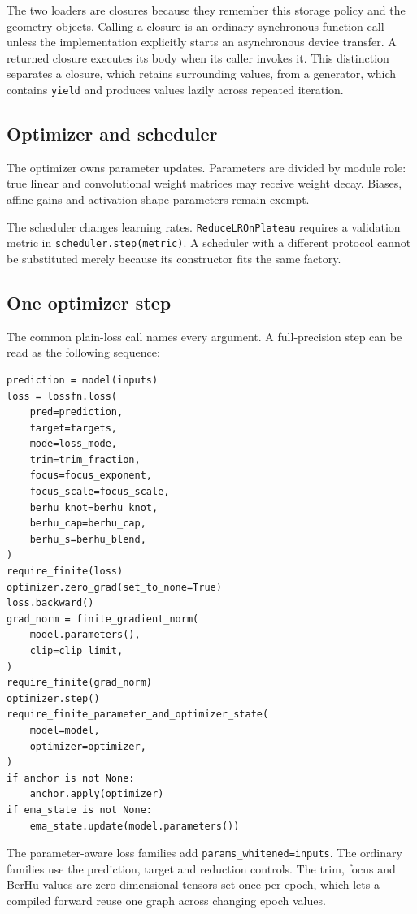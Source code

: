 \documentclass[10pt,aps,prd,twocolumn,nofootinbib]{revtex4-2}
\newcommand{\code}[1]{\texttt{#1}}
\begin{document}
The two loaders are closures because they remember this storage policy and
the geometry objects.  Calling a closure is an ordinary synchronous function
call unless the implementation explicitly starts an asynchronous device
transfer.  A returned closure executes its body when its caller invokes it.
This distinction separates a
closure, which retains surrounding values, from a generator, which contains
\code{yield} and produces values lazily across repeated iteration.

\subsection{Optimizer and scheduler}

The optimizer owns parameter updates.  Parameters are divided by module role:
true linear and convolutional weight matrices may receive weight decay.
Biases, affine gains and activation-shape parameters remain exempt.

The scheduler changes learning rates.  \code{ReduceLROnPlateau} requires a
validation metric in \code{scheduler.step(metric)}.  A scheduler with a
different protocol cannot be substituted merely because its constructor fits
the same factory.

\subsection{One optimizer step}

The common plain-loss call names every argument.  A full-precision step can be
read as the following sequence:
\begin{verbatim}
prediction = model(inputs)
loss = lossfn.loss(
    pred=prediction,
    target=targets,
    mode=loss_mode,
    trim=trim_fraction,
    focus=focus_exponent,
    focus_scale=focus_scale,
    berhu_knot=berhu_knot,
    berhu_cap=berhu_cap,
    berhu_s=berhu_blend,
)
require_finite(loss)
optimizer.zero_grad(set_to_none=True)
loss.backward()
grad_norm = finite_gradient_norm(
    model.parameters(),
    clip=clip_limit,
)
require_finite(grad_norm)
optimizer.step()
require_finite_parameter_and_optimizer_state(
    model=model,
    optimizer=optimizer,
)
if anchor is not None:
    anchor.apply(optimizer)
if ema_state is not None:
    ema_state.update(model.parameters())
\end{verbatim}
The parameter-aware loss families add
\code{params\_whitened=inputs}.  The ordinary families use the prediction,
target and reduction controls.  The trim, focus and BerHu values are
zero-dimensional tensors set once per epoch, which lets a compiled forward
reuse one graph across changing epoch values.
\end{document}

